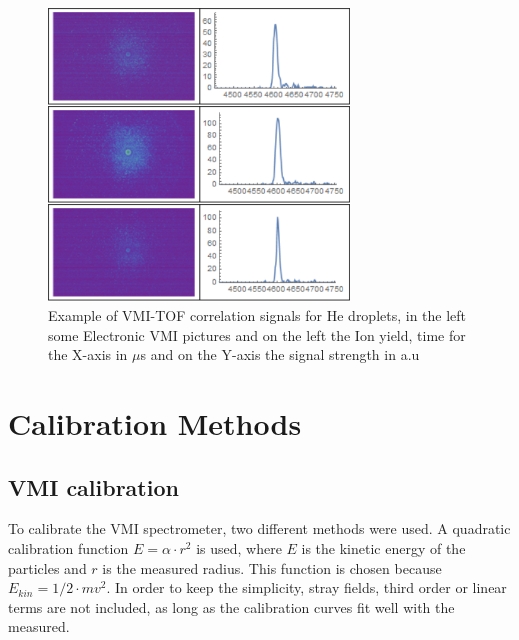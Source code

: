 \begin{figure}[h!]
 \centering
 \includegraphics[width=8cm]{../Images/results/Mir_He_Dropletsize/correlatedsignalexample.png}
  \caption[Correlation signals example]{Example of VMI-TOF correlation signals for He droplets, in the left some Electronic VMI pictures and on the left the Ion yield, time for the X-axis in $\mu$s and  on the Y-axis the signal strength in a.u}
  \label{fig:correlatesimg}
 \end{figure}
  

\section{Calibration Methods}

\subsection{VMI calibration}

To calibrate the VMI spectrometer, two different methods were used. A quadratic calibration function $E=\alpha\cdot r^2$ is used, where $E$ is the kinetic energy of the particles and $r$ is the measured radius. This function is chosen because $E_{kin}=1/2 \cdot m v^2$. In order to keep the simplicity, stray fields, third order or linear terms are not included, as long as the calibration curves fit well with the measured.

